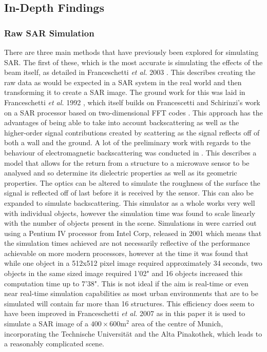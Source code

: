 \subsection{In-Depth Findings}
\label{subsec:in_depth_findings}
\subsubsection{Raw SAR Simulation}
There are three main methods that have previously been explored for simulating SAR. The first of these, which is the most accurate is simulating the effects of the beam itself, as detailed in Franceschetti \textit{et al.} 2003 \cite{franceschettiSARRawSignal2003}. This describes creating the raw data as would be expected in a SAR system in the real world and then transforming it to create a SAR image. The ground work for this was laid in Franceschetti \textit{et al.} 1992 \cite{franceschettiSARASSyntheticAperture1992}, which itself builds on Francescetti and Schirinzi's work on a SAR processor based on two-dimensional FFT codes \cite{franceschettiSARProcessorBased1990}. This approach has the advantages of being able to take into account backscattering as well as the higher-order signal contributions created by scattering as the signal reflects off of both a wall and the ground. A lot of the preliminary work with regards to the behaviour of electromagnetic backscattering was conducted in \cite{franceschettiCanonicalProblemElectromagnetic2002}. This describes a model that allows for the return from a structure to a microwave sensor to be analysed and so determine its dielectric properties as well as its geometric properties. The optics can be altered to simulate the roughness of the surface the signal is reflected off of last before it is received by the sensor. This can also be expanded to simulate backscattering. This simulator as a whole works very well with individual objects, however the simulation time was found to scale linearly with the number of objects present in the scene. Simulations in \cite{franceschettiSARRawSignal2003} were carried out using a Pentium IV processor from Intel Corp, released in 2001 which means that the simulation times achieved are not necessarily reflective of the performance achievable on more modern processors, however at the time it was found that while one object in a 512x512 pixel image required approximately 34 seconds, two objects in the same sized image required 1'02" and 16 objects increased this computation time up to 7'38". This is not ideal if the aim is real-time or even near real-time simulation capabilities as most urban environments that are to be simulated will contain far more than 16 structures. This efficiency does seem to have been improved in Franceschetti \textit{et al.} 2007 \cite{franceschettiSimulationToolsInterpretation2007} as in this paper it is used to simulate a SAR image of a $400\times 600 \textrm{m}^2$ area of the centre of Munich, incorporating the Technische Universität and the Alta Pinakothek, which leads to a reasonably complicated scene.  \par 
